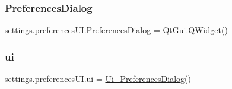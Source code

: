 \subsubsection{\texorpdfstring{Preferences\+Dialog}{PreferencesDialog}}
{\footnotesize\ttfamily settings.\+preferences\+U\+I.\+Preferences\+Dialog = Qt\+Gui.\+Q\+Widget()}

\hypertarget{a00060_ae448bdbd0fb6bba061e4735237500ea5}{}\label{a00060_ae448bdbd0fb6bba061e4735237500ea5} 
\subsubsection{\texorpdfstring{ui}{ui}}
{\footnotesize\ttfamily settings.\+preferences\+U\+I.\+ui = \hyperlink{a00106}{Ui\+\_\+\+Preferences\+Dialog}()}

